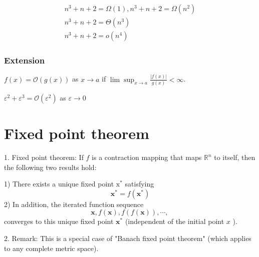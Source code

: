 \documentclass[11pt]{elegantbook}
\begin{document}
\begin{example}
\begin{equation}
    \begin{aligned}
        n^3+n+2=\Omega(1),n^3+n+2=\Omega(n^2)\\
        n^3+n+2=\Theta(n^3)\\
        n^3+n+2=o(n^4)
    \end{aligned}
    \nonumber
\end{equation}
\end{example}

\subsection{Extension}
$f(x)=\mathcal{O}(g(x))$ as $x \rightarrow a$ if $\lim \sup_{x \rightarrow a}\frac{|f(x)|}{g(x)}<\infty$.

\begin{example}
$\varepsilon^2+\varepsilon^3=\mathcal{O}(\varepsilon^2)$ as $\varepsilon \rightarrow 0$
\end{example}


\chapter{Fixed point theorem}
1. Fixed point theorem: If $f$ is a contraction mapping that maps $\mathbb{R}^{n}$ to itself, then the following two results hold:

1) There exists a unique fixed point $\mathrm{x}^{*}$ satisfying
$$
\mathbf{x}^{*}=f\left(\mathbf{x}^{*}\right)
$$
2) In addition, the iterated function sequence
$$
\mathbf{x}, f(\mathbf{x}), f(f(\mathbf{x})), \cdots \text {, }
$$
converges to this unique fixed point $\mathbf{x}^{*}$ (independent of the initial point $x$ ).

2. Remark: This is a special case of "Banach fixed point theorem" (which applies to any complete metric space).
\end{document}
